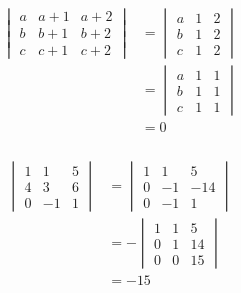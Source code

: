\documentclass{article}
\begin{document}
\begin{align*}
  \begin{vmatrix}
    a & a + 1 & a + 2 \\
    b & b + 1 & b + 2 \\
    c & c + 1 & c + 2
  \end{vmatrix} & = \begin{vmatrix}
                      a & 1 & 2 \\
                      b & 1 & 2 \\
                      c & 1 & 2
                    \end{vmatrix}        \\
                       & = \begin{vmatrix}
                             a & 1 & 1 \\
                             b & 1 & 1 \\
                             c & 1 & 1
                           \end{vmatrix} \\
                       & = 0
\end{align*}

\setcounter{subsubsection}{28}
\subsubsection{}

\begin{align*}
  \begin{vmatrix}
    1 & 1  & 5 \\
    4 & 3  & 6 \\
    0 & -1 & 1
  \end{vmatrix} & = \begin{vmatrix}
                      1 & 1  & 5   \\
                      0 & -1 & -14 \\
                      0 & -1 & 1
                    \end{vmatrix}    \\
                  & = -\begin{vmatrix}
                         1 & 1 & 5  \\
                         0 & 1 & 14 \\
                         0 & 0 & 15
                       \end{vmatrix} \\
                  & = -15
\end{align*}
\end{document}
